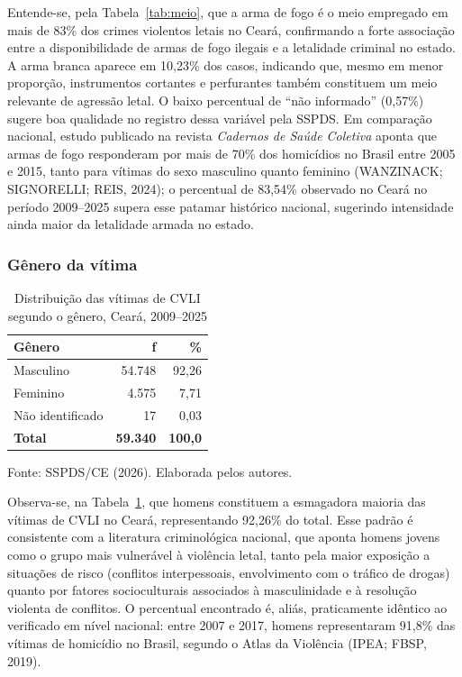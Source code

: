 \documentclass[12pt,a4paper]{article}
\newcommand{\fonte}[1]{  \vspace{-2mm}
  \begin{center}\footnotesize Fonte: #1\end{center}
}
\begin{document}
Entende-se, pela Tabela~\ref{tab:meio}, que a arma de fogo é o meio empregado em mais de 83\% dos crimes violentos letais no Ceará, confirmando a forte associação entre a disponibilidade de armas de fogo ilegais e a letalidade criminal no estado. A arma branca aparece em 10,23\% dos casos, indicando que, mesmo em menor proporção, instrumentos cortantes e perfurantes também constituem um meio relevante de agressão letal. O baixo percentual de ``não informado'' (0,57\%) sugere boa qualidade no registro dessa variável pela SSPDS. Em comparação nacional, estudo publicado na revista \textit{Cadernos de Saúde Coletiva} aponta que armas de fogo responderam por mais de 70\% dos homicídios no Brasil entre 2005 e 2015, tanto para vítimas do sexo masculino quanto feminino (WANZINACK; SIGNORELLI; REIS, 2024); o percentual de 83,54\% observado no Ceará no período 2009--2025 supera esse patamar histórico nacional, sugerindo intensidade ainda maior da letalidade armada no estado.

\subsubsection{Gênero da vítima}

\begin{table}[H]
\centering
\caption{Distribuição das vítimas de CVLI segundo o gênero, Ceará, 2009--2025}
\label{tab:genero}
\begin{tabular}{lrr}
\toprule
\textbf{Gênero} & \textbf{f} & \textbf{\%} \\
\midrule
Masculino      & 54.748 & 92,26 \\
Feminino       & 4.575  & 7,71  \\
Não identificado  & 17     & 0,03  \\
\midrule
\textbf{Total} & \textbf{59.340} & \textbf{100,0} \\
\bottomrule
\end{tabular}
\end{table}
\fonte{SSPDS/CE (2026). Elaborada pelos autores.}

Observa-se, na Tabela~\ref{tab:genero}, que homens constituem a esmagadora maioria das vítimas de CVLI no Ceará, representando 92,26\% do total. Esse padrão é consistente com a literatura criminológica nacional, que aponta homens jovens como o grupo mais vulnerável à violência letal, tanto pela maior exposição a situações de risco (conflitos interpessoais, envolvimento com o tráfico de drogas) quanto por fatores socioculturais associados à masculinidade e à resolução violenta de conflitos. O percentual encontrado é, aliás, praticamente idêntico ao verificado em nível nacional: entre 2007 e 2017, homens representaram 91,8\% das vítimas de homicídio no Brasil, segundo o Atlas da Violência (IPEA; FBSP, 2019).
\end{document}
